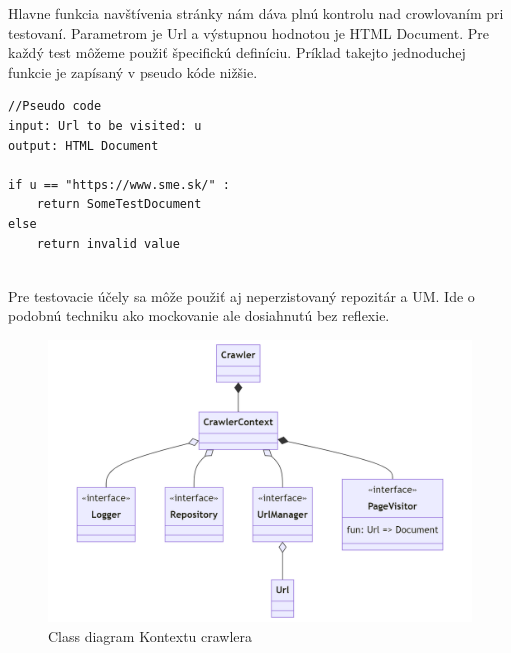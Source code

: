 Hlavne funkcia navštívenia stránky nám dáva plnú kontrolu nad crowlovaním pri testovaní. Parametrom je Url a výstupnou hodnotou je HTML Document. Pre každý test môžeme použiť špecifickú definíciu. Príklad takejto jednoduchej funkcie je zapísaný v pseudo kóde nižšie.

\begin{lstlisting}
//Pseudo code
input: Url to be visited: u
output: HTML Document

if u == "https://www.sme.sk/" :
    return SomeTestDocument
else 
    return invalid value


\end{lstlisting}


Pre testovacie účely sa môže použiť aj neperzistovaný repozitár a UM. Ide o podobnú techniku ako mockovanie ale dosiahnutú bez reflexie. 

\begin{figure}[!ht]
    \centering
    \includegraphics[width=.9\textwidth]{figures/classDiagramContext.png}
    \caption{ Class diagram Kontextu crawlera \label{o:classDiagramContext}}
\end{figure}
